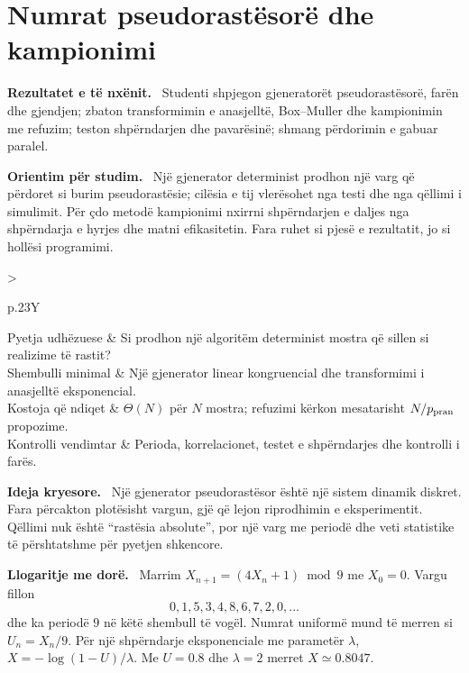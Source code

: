 \documentclass[11pt,oneside,openany]{book}
\newenvironment{qellime}{\par\medskip\noindent\textbf{Rezultatet e të nxënit.}\ }{\par\medskip}
\newenvironment{orientim}{\par\medskip\noindent\textbf{Orientim për studim.}\ }{\par\medskip}
\newenvironment{ideja}{\par\medskip\noindent\textbf{Ideja kryesore.}\ }{\par\medskip}
\newenvironment{llogaritjedore}{\par\medskip\noindent\textbf{Llogaritje me dorë.}\ }{\par\medskip}
\newcommand{\hartakapitullit}[4]{%
\par\smallskip
\noindent\begin{tabularx}{\textwidth}{>{\bfseries\raggedright\arraybackslash}p{.23\textwidth}Y}
Pyetja udhëzuese & #1\\
Shembulli minimal & #2\\
Kostoja që ndiqet & #3\\
Kontrolli vendimtar & #4
\end{tabularx}\par\medskip}
\begin{document}




\chapter{Numrat pseudorastësorë dhe kampionimi}
\begin{qellime}
Studenti shpjegon gjeneratorët pseudorastësorë, farën dhe gjendjen; zbaton transformimin e anasjelltë, Box--Muller dhe kampionimin me refuzim; teston shpërndarjen dhe pavarësinë; shmang përdorimin e gabuar paralel.
\end{qellime}

\begin{orientim}
Një gjenerator determinist prodhon një varg që përdoret si burim
pseudorastësie; cilësia e tij vlerësohet nga testi dhe nga qëllimi i
simulimit. Për çdo metodë kampionimi nxirrni shpërndarjen e daljes nga
shpërndarja e hyrjes dhe matni efikasitetin. Fara ruhet si pjesë e rezultatit,
jo si hollësi programimi.
\end{orientim}

\hartakapitullit
{Si prodhon një algoritëm determinist mostra që sillen si realizime të rastit?}
{Një gjenerator linear kongruencial dhe transformimi i anasjelltë eksponencial.}
{$\Theta(N)$ për $N$ mostra; refuzimi kërkon mesatarisht $N/p_{\rm pran}$ propozime.}
{Perioda, korrelacionet, testet e shpërndarjes dhe kontrolli i farës.}

\begin{ideja}
Një gjenerator pseudorastësor është një sistem dinamik diskret. Fara përcakton
plotësisht vargun, gjë që lejon riprodhimin e eksperimentit. Qëllimi nuk është
``rastësia absolute'', por një varg me periodë dhe veti statistike të
përshtatshme për pyetjen shkencore.
\end{ideja}

\begin{llogaritjedore}
Marrim $X_{n+1}=(4X_n+1)\bmod9$ me $X_0=0$. Vargu fillon
\begin{equation}
 0,1,5,3,4,8,6,7,2,0,\ldots
\end{equation}
dhe ka periodë $9$ në këtë shembull të vogël. Numrat uniformë mund të merren
si $U_n=X_n/9$. Për një shpërndarje eksponenciale me parametër $\lambda$,
$X=-\log(1-U)/\lambda$. Me $U=0.8$ dhe $\lambda=2$ merret
$X\simeq0.8047$.
\end{llogaritjedore}
\end{document}
